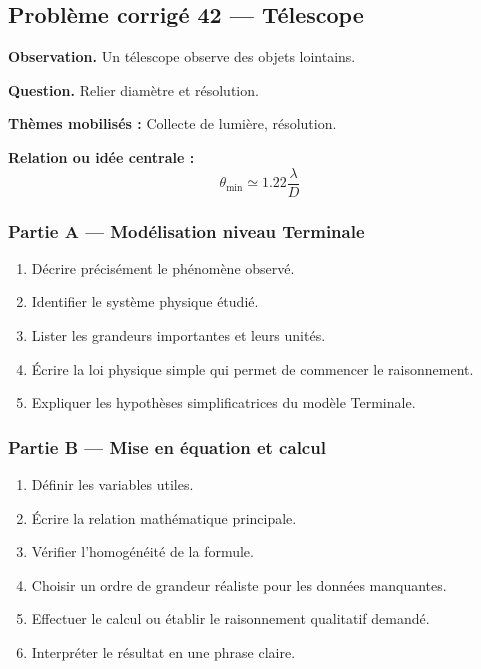 \documentclass[11pt,a4paper]{article}
\begin{document}
\subsection{Problème corrigé 42 — Télescope}

\begin{exercicebox}
\textbf{Observation.} Un télescope observe des objets lointains.

\medskip
\textbf{Question.} Relier diamètre et résolution.

\medskip
\textbf{Thèmes mobilisés :} Collecte de lumière, résolution.

\medskip
\textbf{Relation ou idée centrale :}
\[
\theta_{\min}\simeq1.22\frac{\lambda}{D}
\]
\end{exercicebox}

\subsubsection*{Partie A — Modélisation niveau Terminale}

\begin{enumerate}
  \item Décrire précisément le phénomène observé.
  \item Identifier le système physique étudié.
  \item Lister les grandeurs importantes et leurs unités.
  \item Écrire la loi physique simple qui permet de commencer le raisonnement.
  \item Expliquer les hypothèses simplificatrices du modèle Terminale.
\end{enumerate}

\subsubsection*{Partie B — Mise en équation et calcul}

\begin{enumerate}
  \item Définir les variables utiles.
  \item Écrire la relation mathématique principale.
  \item Vérifier l'homogénéité de la formule.
  \item Choisir un ordre de grandeur réaliste pour les données manquantes.
  \item Effectuer le calcul ou établir le raisonnement qualitatif demandé.
  \item Interpréter le résultat en une phrase claire.
\end{enumerate}
\end{document}
